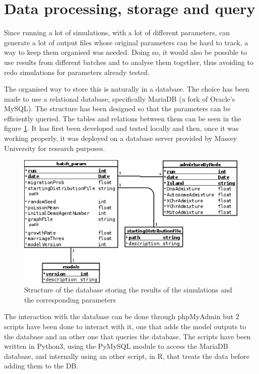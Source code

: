 \documentclass[a4paper,12pt]{report}
\begin{document}
\section{Data processing, storage and query}
Since running a lot of simulations, with a lot of different parameters, can generate a lot of output files whose original parameters can be hard to track, a way to keep them organised was needed. Doing so, it would also be possible to use results from different batches and to analyse them together, thus avoiding to redo simulations for parameters already tested.

The organised way to store this is naturally in a database. The choice has been made to use a relational database, specifically MariaDB (a fork of Oracle’s MySQL). The structure has been designed so that the parameters can be efficiently queried. The tables and relations between them can be seen in the figure \ref{db}. It has first been developed and tested locally and then, once it was working properly, it was deployed on a database server provided by Massey University for research purposes.

\begin{figure}[h]
	\hspace*{-1cm}
	\includegraphics[scale=0.87]{../data/DB.png}
	\caption{Structure of the database storing the results of the simulations and the corresponding parameters}
	\label{db}
\end{figure}

The interaction with the database can be done through phpMyAdmin but 2 scripts have been done to interact with it, one that adds the model outputs to the database and an other one that queries the database. The scripts have been written in Python3, using the PyMySQL module to access the MariaDB database, and internally using an other script, in R, that treats the data before adding them to the DB.
\end{document}
